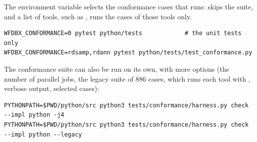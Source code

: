 The environment variable  selects the conformance cases that
 runs:  skips the suite, and a list of tools, such as
, runs the cases of those tools only.

\begin{lstlisting}[style=shell]
WFDBX_CONFORMANCE=0 pytest python/tests            # the unit tests only
WFDBX_CONFORMANCE=rdsamp,rdann pytest python/tests/test_conformance.py
\end{lstlisting}

The conformance suite can also be run on its own, with more options (the number of
parallel jobs, the legacy suite of 886 cases, which runs each tool with ,
verbose output, selected cases):

\begin{lstlisting}[style=shell]
PYTHONPATH=$PWD/python/src python3 tests/conformance/harness.py check --impl python -j4
PYTHONPATH=$PWD/python/src python3 tests/conformance/harness.py check --impl python --legacy
\end{lstlisting}
